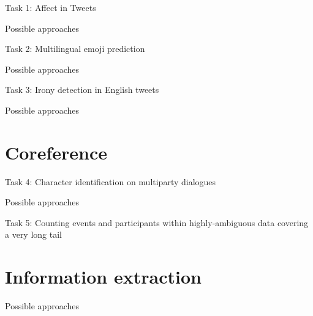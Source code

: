 \documentclass[10pt, compress]{beamer}
\begin{document}
\begin{frame}{Task 1: Affect in Tweets}


\end{frame}

\begin{frame}{Possible approaches}


\end{frame}

\begin{frame}{Task 2: Multilingual emoji prediction}


\end{frame}

\begin{frame}{Possible approaches}


\end{frame}

\begin{frame}{Task 3: Irony detection in English tweets}


\end{frame}

\begin{frame}{Possible approaches}

\section{Coreference}

\end{frame}

\begin{frame}{Task 4: Character identification on multiparty dialogues}


\end{frame}

\begin{frame}{Possible approaches}


\end{frame}

\begin{frame}{Task 5: Counting events and participants within highly-ambiguous data covering a very long tail}


\end{frame}

\section{Information extraction}

\begin{frame}{Possible approaches}


\end{frame}
\end{document}
